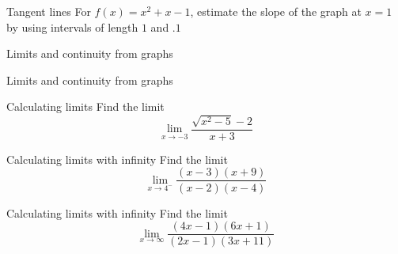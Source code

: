 \documentclass[t]{beamer}
\begin{document}
\begin{frame}{Tangent lines}
For $f(x) = x^2 + x -1$, estimate the slope of the
graph at $x = 1$ by using intervals of length $1$ and $.1$
\end{frame}

\begin{frame}{Limits and continuity from graphs}
\end{frame}

\begin{frame}{Limits and continuity from graphs}
\end{frame}

\begin{frame}{Calculating limits}
Find the limit
$$\lim_{x \to -3} \frac{\sqrt{x^2 - 5} -2}{x + 3}$$
\end{frame}

\begin{frame}{Calculating limits with infinity}
Find the limit
$$\lim_{x \to 4^{-}} \frac{(x-3)(x+9)}{(x-2)(x-4)}$$
\end{frame}

\begin{frame}{Calculating limits with infinity}
Find the limit
$$\lim_{x \to \infty} \frac{(4x-1)(6x+1)}{(2x-1)(3x+11)}$$
\end{frame}
\end{document}
